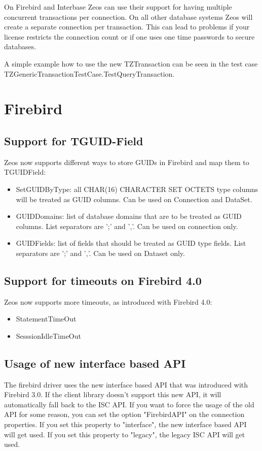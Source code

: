 \documentclass[a4paper,12pt,oneside]{report}
\begin{document}
On Firebird and Interbase Zeos can use their support for having multiple concurrent transactions per connection.
On all other database systems Zeos will create a separate connection per transaction.
This can lead to problems if your license restricts the connection count or if one uses one time passwords to secure databases.

A simple example how to use the new TZTransaction can be seen in the test case TZGenericTransactionTestCase.TestQueryTransaction.


\section{Firebird}

\subsection{Support for TGUID-Field}
Zeos now supports different ways to store GUIDs in Firebird and map them to TGUIDField:
\begin{itemize}
  \item SetGUIDByType: all CHAR(16) CHARACTER SET OCTETS type columns will be treated as GUID columns. Can be used on Connection and DataSet.
  \item GUIDDomains: list of database domains that are to be treated as GUID columns. List separators are ';' and ','. Can be used on connection only.
  \item GUIDFields: list of fields that should be treated as GUID type fields. List separators are ';' and ','. Can be used on Dataset only.
\end{itemize}

\subsection{Support for timeouts on Firebird 4.0}
Zeos now supports more timeouts, as introduced with Firebird 4.0:
\begin{itemize}
  \item StatementTimeOut
  \item SesssionIdleTimeOut
\end{itemize}

\subsection{Usage of new interface based API}
The firebird driver uses the new interface based API that was introduced with Firebird 3.0.
If the client library doesn't support this new API, it will automatically fall back to the ISC API.
If you want to force the usage of the old API for some reason, you can set the option "FirebirdAPI" on the connection properties.
If you set this property to "interface", the new interface based API will get used.
If you set this property to "legacy", the legacy ISC API will get used.
\end{document}
